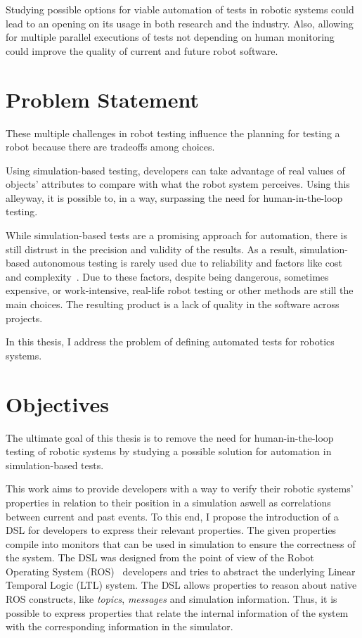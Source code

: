 Studying possible options for viable automation of tests in robotic systems could lead to an opening on its usage in both research and the industry. Also, allowing for multiple parallel executions of tests not depending on human monitoring could improve the quality of current and future robot software.


\section{Problem Statement}
\label{sec:problem}

These multiple challenges in robot testing influence the planning for testing a robot because there are tradeoffs among choices.

Using simulation-based testing, developers can take advantage of real values of objects' attributes to compare with what the robot system perceives. Using this alleyway, it is possible to, in a way, surpassing the need for human-in-the-loop testing. 
 
While simulation-based tests are a promising approach for automation, there is still distrust in the precision and validity of the results. As a result, simulation-based autonomous testing is rarely used due to reliability and factors like cost and complexity~\cite{9240632,zizyte2021importance}.
Due to these factors, despite being dangerous, sometimes expensive, or work-intensive, real-life robot testing or other methods are still the main choices. The resulting product is a lack of quality in the software across projects.

In this thesis, I address the problem of defining automated tests for robotics systems.


\section{Objectives}
\label{sec:objectives}

The ultimate goal of this thesis is to remove the need for human-in-the-loop testing of robotic systems by studying a possible solution for automation in simulation-based tests.

This work aims to provide developers with a way to verify their robotic systems' properties in relation to their position in a simulation aswell as correlations between current and past events. To this end, I propose the introduction of a DSL for developers to express their relevant properties. The given properties compile into monitors that can be used in simulation to ensure the correctness of the system. The DSL was designed from the point of view of the Robot Operating System (ROS)~\cite{quigley2009ros} developers and tries to abstract the underlying Linear Temporal Logic (LTL) system. The DSL allows properties to reason about native ROS constructs, like \textit{topics}, \textit{messages} and simulation information. Thus, it is possible to express properties that relate the internal information of the system with the corresponding information in the simulator.

